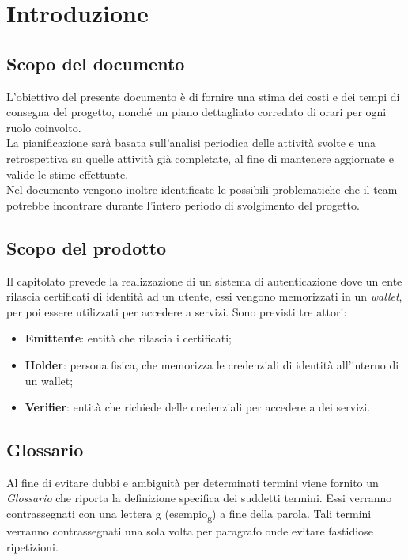 \section{Introduzione}

\subsection{Scopo del documento}
L’obiettivo del presente documento è di fornire una stima dei costi e dei tempi di consegna del progetto, nonché un piano dettagliato corredato di orari per ogni ruolo coinvolto. \\
La pianificazione sarà basata sull’analisi periodica delle attività svolte e una retrospettiva su quelle attività già completate, al fine di mantenere aggiornate e valide le 
stime effettuate. \\ Nel documento vengono inoltre identificate le possibili problematiche che il team potrebbe incontrare durante l’intero periodo di svolgimento del progetto.

\subsection{Scopo del prodotto}
Il capitolato prevede la realizzazione di un sistema di autenticazione dove un ente rilascia certificati di identità ad un utente, essi vengono memorizzati in un \textit{wallet}, 
per poi essere utilizzati per accedere a servizi. Sono previsti tre attori:
\begin{itemize}
    \item \textbf{Emittente}: entità che rilascia i certificati;
    \item \textbf{Holder}: persona fisica, che memorizza le credenziali di identità all'interno di un wallet;
    \item \textbf{Verifier}: entità che richiede delle credenziali per accedere a dei servizi.
\end{itemize}

\subsection{Glossario}
Al fine di evitare dubbi e ambiguità per determinati termini viene fornito un \textit{Glossario} che riporta la definizione specifica dei suddetti termini. 
Essi verranno contrassegnati con una lettera g (esempio\textsubscript{g}) a fine della parola. 
Tali termini verranno contrassegnati una sola volta per paragrafo onde evitare fastidiose ripetizioni. 

